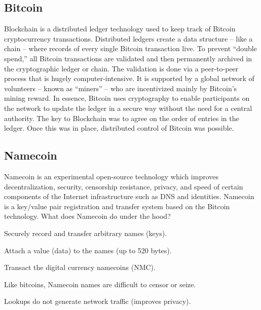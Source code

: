 \subsection*{Bitcoin}
Blockchain is a distributed ledger technology used to keep track of Bitcoin cryptocurrency transactions. Distributed ledgers create a data structure – like a chain – where records of every single Bitcoin transaction live. To prevent “double spend,” all Bitcoin transactions are validated and then permanently archived in the cryptographic ledger or chain. The validation is done via a peer-to-peer process that is hugely computer-intensive. It is supported by a global network of volunteers – known as “miners” – who are incentivized mainly by Bitcoin’s mining reward.
In essence, Bitcoin uses cryptography to enable participants on the network to update the ledger in a secure way without the need for a central authority. The key to Blockchain was to agree on the order of entries in the ledger. Once this was in place, distributed control of Bitcoin was possible.

\subsection*{Namecoin}
Namecoin is an experimental open-source technology which improves decentralization, security, censorship resistance, privacy, and speed of certain components of the Internet infrastructure such as DNS and identities. Namecoin is a key/value pair registration and transfer system based on the Bitcoin technology.
What does Namecoin do under the hood?
\begin{list}{}{}
\item Securely record and transfer arbitrary names (keys).
\item Attach a value (data) to the names (up to 520 bytes).
\item Transact the digital currency namecoins (NMC).
\item Like bitcoins, Namecoin names are difficult to censor or seize.
\item Lookups do not generate network traffic (improves privacy).
\end{list}

